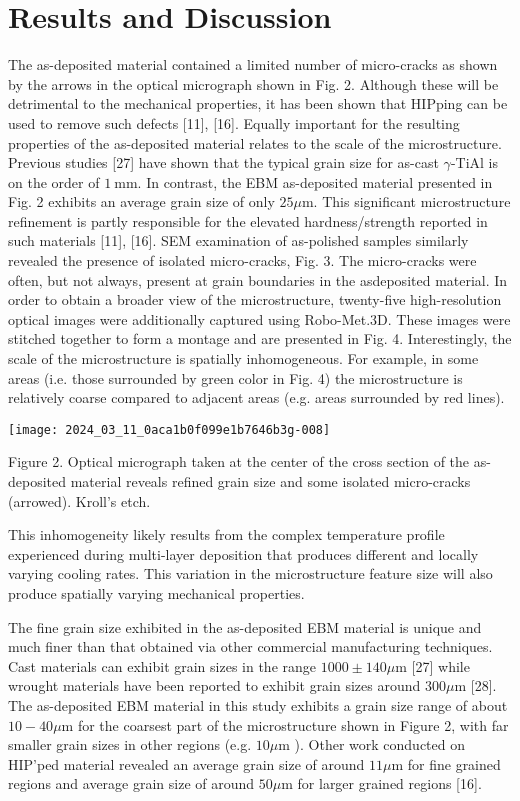 \documentclass[10pt]{article}
\begin{document}
\section*{Results and Discussion}
The as-deposited material contained a limited number of micro-cracks as shown by the arrows in the optical micrograph shown in Fig. 2. Although these will be detrimental to the mechanical properties, it has been shown that HIPping can be used to remove such defects [11], [16]. Equally important for the resulting properties of the as-deposited material relates to the scale of the microstructure. Previous studies [27] have shown that the typical grain size for as-cast $\gamma$-TiAl is on the order of $1 \mathrm{~mm}$. In contrast, the EBM as-deposited material presented in Fig. 2 exhibits an average grain size of only $25 \mu \mathrm{m}$. This significant microstructure refinement is partly responsible for the elevated hardness/strength reported in such materials [11], [16]. SEM examination of as-polished samples similarly revealed the presence of isolated micro-cracks, Fig. 3. The micro-cracks were often, but not always, present at grain boundaries in the asdeposited material. In order to obtain a broader view of the microstructure, twenty-five high-resolution optical images were additionally captured using Robo-Met.3D. These images were stitched together to form a montage and are presented in Fig. 4. Interestingly, the scale of the microstructure is spatially inhomogeneous. For example, in some areas (i.e. those surrounded by green color in Fig. 4) the microstructure is relatively coarse compared to adjacent areas (e.g. areas surrounded by red lines).

\begin{center}
\texttt{[image: 2024\_03\_11\_0aca1b0f099e1b7646b3g-008]}
\end{center}

Figure 2. Optical micrograph taken at the center of the cross section of the as-deposited material reveals refined grain size and some isolated micro-cracks (arrowed). Kroll's etch.

This inhomogeneity likely results from the complex temperature profile experienced during multi-layer deposition that produces different and locally varying cooling rates. This variation in the microstructure feature size will also produce spatially varying mechanical properties.

The fine grain size exhibited in the as-deposited EBM material is unique and much finer than that obtained via other commercial manufacturing techniques. Cast materials can exhibit grain sizes in the range $1000 \pm 140 \mu \mathrm{m}$ [27] while wrought materials have been reported to exhibit grain sizes around $300 \mu \mathrm{m}$ [28]. The as-deposited EBM material in this study exhibits a grain size range of about $10-40 \mu \mathrm{m}$ for the coarsest part of the microstructure shown in Figure 2, with far smaller grain sizes in other regions (e.g. $10 \mu \mathrm{m}$ ). Other work conducted on HIP'ped material revealed an average grain size of around $11 \mu \mathrm{m}$ for fine grained regions and average grain size of around $50 \mu \mathrm{m}$ for larger grained regions [16].
\end{document}
